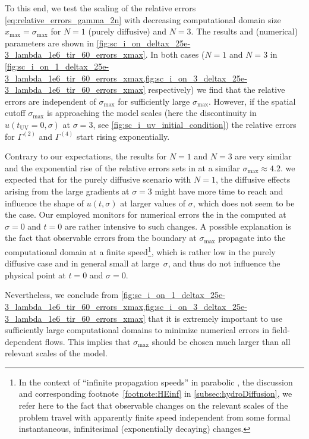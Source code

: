 To this end, we test the scaling of the relative errors \eqref{eq:relative_errors_gamma_2n} with decreasing computational domain size $x_\mathrm{max} = \sigma_\mathrm{max}$ for $N = 1$ (purely diffusive) and $N = 3$. 
The results and (numerical) parameters are shown in \cref{fig:sc_i_on_deltax_25e-3_lambda_1e6_tir_60_errors_xmax}.
In both cases ($N=1$ and $N=3$ in \cref{fig:sc_i_on_1_deltax_25e-3_lambda_1e6_tir_60_errors_xmax,fig:sc_i_on_3_deltax_25e-3_lambda_1e6_tir_60_errors_xmax} respectively) we find that the relative errors are independent of $\sigma_\mathrm{max}$ for sufficiently large $\sigma_\mathrm{max}$.
However, if the spatial cutoff $\sigma_\mathrm{max}$ is approaching the model scales (here the discontinuity in $u ( t_\mathrm{UV} = 0, \sigma )$ at $\sigma = 3$, see \cref{fig:sc_i_uv_initial_condition}) the relative errors for $\Gamma^{(2)}$ and $\Gamma^{(4)}$ start rising exponentially.

Contrary to our expectations, the results for $N = 1$ and $N = 3$ are very similar and the exponential rise of the relative errors sets in at a similar $\sigma_\mathrm{max}\approx 4.2$.
\Apriori{} we expected that for the purely diffusive scenario with $N = 1$, the diffusive effects arising from the large gradients at $\sigma = 3$ might have more time to reach and influence the shape of $u ( t, \sigma )$ at larger values of $\sigma$, which does not seem to be the case.
Our employed monitors for numerical errors \dash{} the \ipi{} \nptFunctions{} in the \ir{} computed at $\sigma=0$ and $t=0$ \dash{} are rather intensive to such changes.
A possible explanation is the fact that observable errors from the boundary at $\sigma_\mathrm{max}$ propagate into the computational domain at a finite speed\footnote{
	In the context of ``infinite propagation speeds'' in parabolic \pdes{}, \cf{} the discussion and corresponding footnote~\ref{footnote:HEinf} in \cref{subsec:hydroDiffusion}, we refer here to the fact that observable changes on the relevant scales of the problem travel with apparently finite speed independent from some formal instantaneous, infinitesimal (exponentially decaying) changes.%
}, which is rather low in the purely diffusive case and in general small at large~$\sigma$, and thus do not influence the physical point at $t=0$ and $\sigma=0$. 

Nevertheless, we conclude from \cref{fig:sc_i_on_1_deltax_25e-3_lambda_1e6_tir_60_errors_xmax,fig:sc_i_on_3_deltax_25e-3_lambda_1e6_tir_60_errors_xmax} that it is extremely important to use sufficiently large computational domains to minimize numerical errors in field-dependent \frg{} flows. 
This implies that $\sigma_\mathrm{max}$ should be chosen much larger than all relevant scales of the model.

